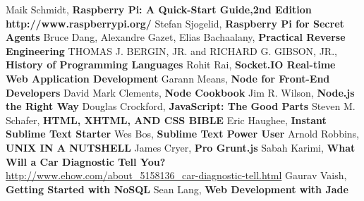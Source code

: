 \documentclass[11pt, oneside]{Thesis} %
\begin{document}
\begin{thebibliography}{999}
Maik Schmidt, \textbf{Raspberry Pi: A Quick-Start Guide,2nd Edition}
\textbf{http://www.raspberrypi.org/}
Stefan Sjogelid, \textbf{Raspberry Pi for Secret Agents}
Bruce Dang, Alexandre Gazet, Elias Bachaalany, \textbf{Practical Reverse Engineering}
THOMAS J. BERGIN, JR. and RICHARD G. GIBSON, JR., \textbf{History of Programming Languages}
Rohit Rai, \textbf{Socket.IO Real-time Web Application Development}
Garann Means, \textbf{Node for Front-End Developers}
David Mark Clements, \textbf{Node Cookbook}
Jim R. Wilson, \textbf{Node.js the Right Way}
Douglas Crockford, \textbf{JavaScript: The Good Parts}
Steven M. Schafer, \textbf{HTML, XHTML, AND CSS BIBLE}
Eric Haughee, \textbf{Instant Sublime Text Starter}
Wes Bos, \textbf{Sublime Text Power User}
Arnold Robbins, \textbf{UNIX IN A NUTSHELL}
James Cryer, \textbf{Pro Grunt.js}
Sabah Karimi, \textbf{What Will a Car Diagnostic Tell You?} \url{http://www.ehow.com/about_5158136_car-diagnostic-tell.html}
Gaurav Vaish, \textbf{Getting Started with NoSQL}
Sean Lang, \textbf{Web Development with Jade}
\end{thebibliography}
\end{document}
